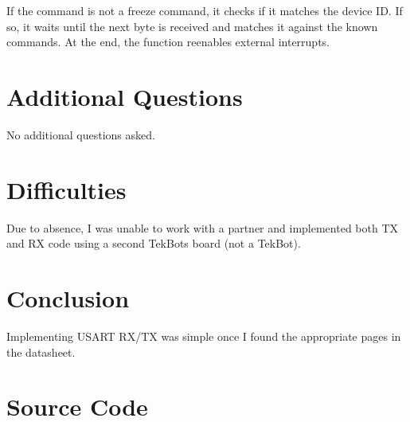 \documentclass[12pt,letterpaper]{article}
\begin{document}
If the command is not a freeze command, it checks if it matches the device ID. If so, it waits until the next byte is received and matches it against the known commands. At the end, the function reenables external interrupts.


\section*{Additional Questions}

No additional questions asked.

\section*{Difficulties}

Due to absence, I was unable to work with a partner and implemented both TX and RX code using a second TekBots board (not a TekBot).

\section*{Conclusion}

Implementing USART RX/TX was simple once I found the appropriate pages in the datasheet.

\section*{Source Code}



\end{document}
